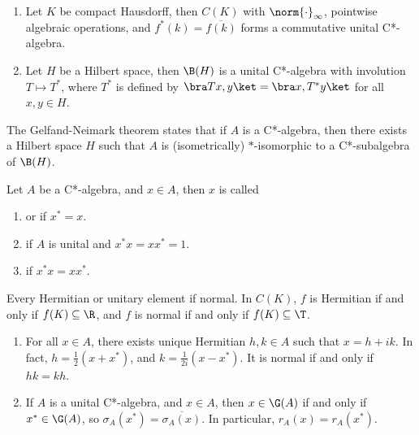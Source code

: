 \documentclass[a4paper]{article}
\begin{document}
\begin{eg}
	\begin{enumerate}[label=(\arabic*)]
		\item Let $K$ be compact Hausdorff, then $C(K)$ with $\norm{\cdot}_\infty$, pointwise algebraic operations, and $f^*(k)=\overline{f(k)}$ forms a commutative unital C*-algebra.
		\item Let $H$ be a Hilbert space, then $\B(H)$ is a unital C*-algebra with involution $T\mapsto T^*$, where $T^*$ is defined by $\bra Tx,y\ket=\bra x,T^*y\ket$ for all $x,y\in H$.
	\end{enumerate}
\end{eg}

\begin{remark}
  The Gelfand-Neimark theorem states that if $A$ is a C*-algebra, then there exists a Hilbert space $H$ such that $A$ is (isometrically) $*$-isomorphic to a C*-subalgebra of $\B(H)$.
\end{remark}

Let $A$ be a C*-algebra, and $x\in A$, then $x$ is called
\begin{enumerate}[label=(\roman*)]
	\item {} or  if $x^*=x$.
	\item {} if $A$ is unital and $x^*x=xx^*=1$.
	\item {} if $x^*x=xx^*$.
\end{enumerate}

\begin{eg}
  Every Hermitian or unitary element if normal. In $C(K)$, $f$ is Hermitian if and only if $f(K)\subseteq\R$, and $f$ is normal if and only if $f(K)\subseteq\T$.
\end{eg}

\begin{remark}
	\begin{enumerate}[label=(\arabic*)]
		\item For all $x\in A$, there exists unique Hermitian $h,k\in A$ such that $x=h+ik$. In fact, $h=\frac{1}{2}(x+x^*)$, and $k=\frac{1}{2i}(x-x^*)$. It is normal if and only if $hk=kh$.
		\item If $A$ is a unital C*-algebra, and $x\in A$, then $x\in\G(A)$ if and only if $x^*\in\G(A)$, so $\sigma_A(x^*)=\overline{\sigma_A(x)}$. In particular, $r_A(x)=r_A(x^*)$.
	\end{enumerate}
\end{remark}
\end{document}
